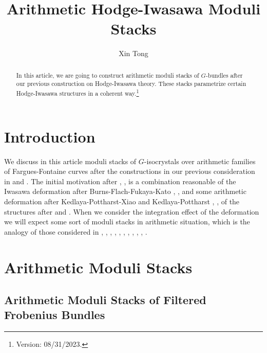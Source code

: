 \documentclass[12pt]{article}
\title{Arithmetic Hodge-Iwasawa Moduli Stacks}
\author{Xin Tong}
\date{}
\theoremstyle{definition}
\numberwithin{equation}{section}
\begin{document}
\maketitle

\begin{abstract}
\noindent In this article, we are going to construct arithmetic moduli stacks of $G$-bundles after our previous construction on Hodge-Iwasawa theory. These stacks parametrize certain Hodge-Iwasawa structures in a coherent way.\footnote{Version: 08/31/2023.}
\end{abstract}



\newpage
\tableofcontents





\newpage
\section{Introduction}

We discuss in this article moduli stacks of $G$-isocrystals over arithmetic families of Fargues-Fontaine curves after the constructions in our previous consideration in \cite{T1} and \cite{T2}. The initial motivation after \cite{Iwa}, \cite{T}, \cite{F} is a combination reasonable of the Iwasawa deformation after Burns-Flach-Fukaya-Kato \cite{BF1}, \cite{BF2}, \cite{FK} and some arithmetic deformation after Kedlaya-Pottharst-Xiao and Kedlaya-Pottharst \cite{KPX}, \cite{KP}, of the structures after \cite{KL1} and \cite{KL2}. When we consider the integration effect of the deformation we will expect some sort of moduli stacks in arithmetic situation, which is the analogy of those considered in \cite{He1}, \cite{PR}, \cite{Dr}, \cite{SW}, \cite{Ked}, \cite{RZ}, \cite{G}, \cite{Dr1}, \cite{Har}, \cite{Har1},  \cite{HV}.








\section{Arithmetic Moduli Stacks}


 

\subsection{Arithmetic Moduli Stacks of Filtered Frobenius Bundles}
\end{document}
